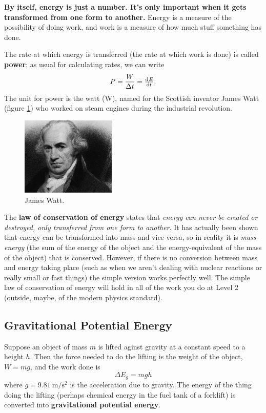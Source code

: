 \documentclass[a4paper]{amsbook}
\newcommand\capcite[1]{}
\begin{document}
\textbf{By itself, energy is just a number. It's only important when it gets transformed from one form to another.} Energy is
a measure of the possibility of doing work, and work is a measure of how much stuff something has done.

The rate at which energy is transferred (the rate at which work is done) is called \textbf{power}; as usual for calculating
rates, we can write
\begin{equation}
  P = \frac{W}{\Delta t} = \od{E}{t}. \label{eqn:power}
\end{equation}
The unit for power is the watt (W), named for the Scottish inventor James Watt (figure \ref{fig:watt}) who worked
on steam engines during the industrial revolution.

\begin{figure}
  \centering
  \includegraphics[width=0.4\textwidth]{watt}
  \caption{James Watt. \capcite{https://www.thefamouspeople.com/profiles/images/james-watt-3.jpg}\label{fig:watt}}
\end{figure}

The \textbf{law of conservation of energy} states that \textit{energy can never be created or destroyed, only transferred
from one form to another}. It has actually been shown that energy can be transformed into mass and vice-versa, so in reality
it is \textit{mass-energy} (the sum of the energy of the object and the energy-equivalent of the mass of the object) that is
conserved. However, if there is no conversion between mass and energy taking place (such as when we aren't dealing with nuclear
reactions or really small or fast things) the simple version works perfectly well. The simple law of conservation of energy will
hold in all of the work you do at Level 2 (outside, maybe, of the modern physics standard).

\subsection{Gravitational Potential Energy}
Suppose an object of mass $ m $ is lifted aginst gravity at a constant speed to a height $ h $. Then the force needed to do
the lifting is the weight of the object, $ W = mg $, and the work done is
\begin{equation}
  \Delta E_g = mgh
\end{equation}
where $ g = \SI{9.81}{\metre\per\second\squared} $ is the acceleration due to gravity. The energy of the thing doing the lifting
(perhaps chemical energy in the fuel tank of a forklift) is converted into \textbf{gravitational potential energy}.
\end{document}
